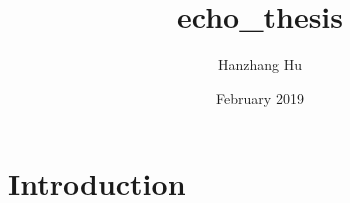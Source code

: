 \documentclass{article}
\title{echo_thesis}
\author{Hanzhang Hu}
\date{February 2019}
\begin{document}
\maketitle

\section{Introduction}
\end{document}
